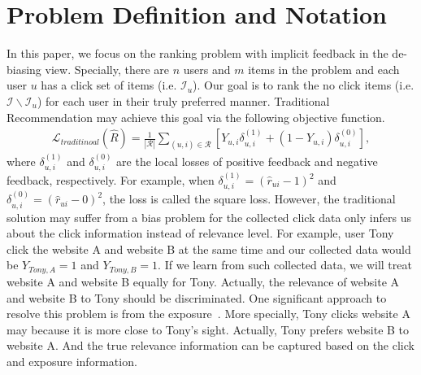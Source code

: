 \documentclass[sigconf]{acmart}
\begin{document}
\section{Problem Definition and Notation}
	In this paper, we focus on the ranking problem with implicit feedback in the de-biasing view. Specially, there are $n$ users and $m$ items in the problem and each user $u$ has a click set of items (i.e. $\mathcal{I}_u$). Our goal is to rank the no click items (i.e.  $\mathcal{I} \backslash \mathcal{I}_u$) for each user in their truly preferred manner. Traditional Recommendation may achieve this goal via the following objective function.
\begin{eqnarray}\label{eq:traditionalLoss}
	\mathcal{L}_{traditinoal}(\hat{R}) = \frac{1}{|\mathcal{R}|} \sum_{(u, i) \in \mathcal{R}}^{} \left[Y_{u, i}\delta_{u, i}^{(1)} +\left(1 -Y_{u, i}\right)\delta_{u, i}^{(0)} \right] ,
\end{eqnarray}
where $\delta_{u, i}^{(1)}$ and $\delta_{u, i}^{(0)}$ are the local losses of positive feedback and negative feedback, respectively. For example, when $\delta_{u, i}^{(1)} = (\hat{r}_{ui}-1)^2$ and $\delta_{u, i}^{(0)} = (\hat{r}_{ui}-0)^2$, the loss is called the square loss.
However, the traditional solution may suffer from a bias problem for the collected click data only infers us about the click information instead of relevance level. For example, user Tony click the website A and website B at the same time and our collected data would be $Y_{Tony, A} = 1$ and $Y_{Tony, B} = 1$. If we learn from such collected data, we will treat website A and website B equally for Tony. Actually, the relevance of website A and website B to Tony should be discriminated. One significant approach to resolve this problem is from the exposure~\cite{saito2020unbiased}. More specially, Tony clicks website A may because it is more close to Tony's sight. Actually, Tony prefers website B to website A. And the true relevance information can be captured based on the click and exposure information.
\end{document}
